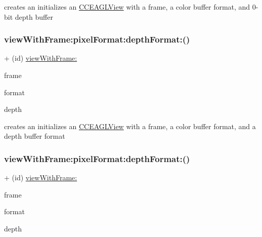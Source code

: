 creates an initializes an \hyperlink{interfaceCCEAGLView}{C\+C\+E\+A\+G\+L\+View} with a frame, a color buffer format, and 0-\/bit depth buffer \mbox{\label{interfaceCCEAGLView_a5881eaa6db03c2702e9d15fcc63cb157}} 
\subsubsection{\texorpdfstring{view\+With\+Frame\+:pixel\+Format\+:depth\+Format\+:()}{viewWithFrame:pixelFormat:depthFormat:()}\hspace{0.1cm}{\footnotesize\ttfamily [1/2]}}
{\footnotesize\ttfamily + (id) \hyperlink{interfaceCCEAGLView_a288ea52be7dd891bbc9e0ee7e18cdf24}{view\+With\+Frame\+:} \begin{DoxyParamCaption}\item[{(C\+G\+Rect)}]{frame }\item[{pixelFormat:(N\+S\+String$\ast$)}]{format }\item[{depthFormat:(G\+Luint)}]{depth }\end{DoxyParamCaption}}

creates an initializes an \hyperlink{interfaceCCEAGLView}{C\+C\+E\+A\+G\+L\+View} with a frame, a color buffer format, and a depth buffer format \mbox{\label{interfaceCCEAGLView_a5881eaa6db03c2702e9d15fcc63cb157}} 
\subsubsection{\texorpdfstring{view\+With\+Frame\+:pixel\+Format\+:depth\+Format\+:()}{viewWithFrame:pixelFormat:depthFormat:()}\hspace{0.1cm}{\footnotesize\ttfamily [2/2]}}
{\footnotesize\ttfamily + (id) \hyperlink{interfaceCCEAGLView_a288ea52be7dd891bbc9e0ee7e18cdf24}{view\+With\+Frame\+:} \begin{DoxyParamCaption}\item[{(C\+G\+Rect)}]{frame }\item[{pixelFormat:(N\+S\+String $\ast$)}]{format }\item[{depthFormat:(G\+Luint)}]{depth }\end{DoxyParamCaption}}

